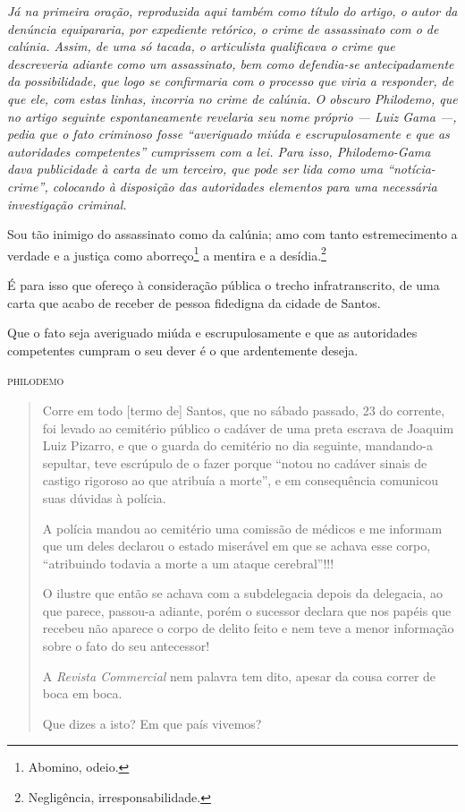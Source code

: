 \begin{didascalia}
\emph{Já na primeira oração, reproduzida aqui também como título do
artigo, o autor da denúncia equipararia, por expediente retórico, o
crime de assassinato com o de calúnia. Assim, de uma só tacada, o
articulista qualificava o crime que descreveria adiante como um
assassinato, bem como defendia-se antecipadamente da possibilidade, que
logo se confirmaria com o processo que viria a responder, de que ele,
com estas linhas, incorria no crime de calúnia. O obscuro Philodemo, que
no artigo seguinte espontaneamente revelaria seu nome próprio --- Luiz
Gama ---, pedia que o fato criminoso fosse ``averiguado miúda e
escrupulosamente e que as autoridades competentes'' cumprissem com a lei.
Para isso, Philodemo-Gama dava publicidade à carta de um terceiro,
que pode ser lida como uma ``notícia-crime'', colocando à disposição das
autoridades elementos para uma necessária investigação criminal.}
\end{didascalia}



Sou tão inimigo do assassinato como da calúnia; amo com tanto
estremecimento a verdade e a justiça como aborreço\footnote{ Abomino,
  odeio.} a mentira e a desídia.\footnote{ Negligência,
  irresponsabilidade.}

É para isso que ofereço à consideração pública o trecho
infratranscrito, de uma carta que acabo de receber de pessoa fidedigna
da cidade de Santos.

Que o fato seja averiguado miúda e escrupulosamente e que as autoridades
competentes cumpram o seu dever é o que ardentemente deseja.

\begin{flushright}
\textsc{philodemo}
\end{flushright}

\asterisc{}


\begin{quote}
Corre em todo {[}termo de{]} Santos, que no sábado passado, 23 do
corrente, foi levado ao cemitério público o cadáver de uma preta escrava
de Joaquim Luiz Pizarro, e que o guarda do cemitério no dia seguinte,
mandando-a sepultar, teve escrúpulo de o fazer porque ``notou no cadáver
sinais de castigo rigoroso ao que atribuía a morte'', e em consequência
comunicou suas dúvidas à polícia.

A polícia mandou ao cemitério uma comissão de médicos e me informam que
um deles declarou o estado miserável em que se achava esse corpo,
``atribuindo todavia a morte a um ataque cerebral''!!!

O ilustre que então se achava com a subdelegacia depois da delegacia, ao
que parece, passou-a adiante, porém o sucessor declara que nos papéis
que recebeu não aparece o corpo de delito feito e nem teve a menor
informação sobre o fato do seu antecessor!

A \emph{Revista Commercial} nem palavra tem dito, apesar da cousa correr
de boca em boca.

Que dizes a isto? Em que país vivemos?
\end{quote}

